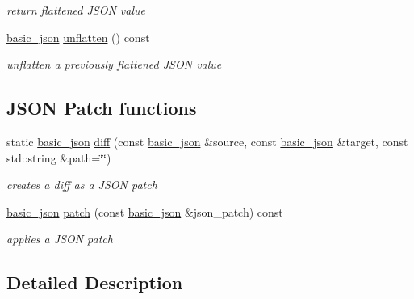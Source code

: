 \begin{DoxyCompactItemize}
\begin{DoxyCompactList}\small\item\em return flattened J\+S\+ON value \end{DoxyCompactList}\item 
\mbox{\hyperlink{classnlohmann_1_1basic__json}{basic\+\_\+json}} \mbox{\hyperlink{classnlohmann_1_1basic__json_a74fa3ab2003f2f6f2b69deaafed9126d}{unflatten}} () const
\begin{DoxyCompactList}\small\item\em unflatten a previously flattened J\+S\+ON value \end{DoxyCompactList}\end{DoxyCompactItemize}
\subsection*{J\+S\+ON Patch functions}
\begin{DoxyCompactItemize}
\item 
static \mbox{\hyperlink{classnlohmann_1_1basic__json}{basic\+\_\+json}} \mbox{\hyperlink{classnlohmann_1_1basic__json_a543bd5f7490de54c875b2c0912dc9a49}{diff}} (const \mbox{\hyperlink{classnlohmann_1_1basic__json}{basic\+\_\+json}} \&source, const \mbox{\hyperlink{classnlohmann_1_1basic__json}{basic\+\_\+json}} \&target, const std\+::string \&path=\char`\"{}\char`\"{})
\begin{DoxyCompactList}\small\item\em creates a diff as a J\+S\+ON patch \end{DoxyCompactList}\item 
\mbox{\hyperlink{classnlohmann_1_1basic__json}{basic\+\_\+json}} \mbox{\hyperlink{classnlohmann_1_1basic__json_a81e0c41a4a9dff4df2f6973f7f8b2a83}{patch}} (const \mbox{\hyperlink{classnlohmann_1_1basic__json}{basic\+\_\+json}} \&json\+\_\+patch) const
\begin{DoxyCompactList}\small\item\em applies a J\+S\+ON patch \end{DoxyCompactList}\end{DoxyCompactItemize}


\subsection{Detailed Description}
